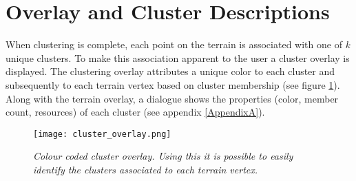 \section{Overlay and Cluster Descriptions}

When clustering is complete, each point on the terrain is associated with one of \textit{k} unique clusters. To make this association apparent to the user a cluster overlay is displayed. The clustering overlay attributes a unique color to each cluster and subsequently to each terrain vertex based on cluster membership (see figure \ref{fig:cluster_overlay}). Along with the terrain overlay, a dialogue shows the properties (color, member count, resources) of each cluster (see appendix \ref{AppendixA}).

\begin{figure}
\center
	\texttt{[image: cluster\_overlay.png]}
	\caption{ \textit{Colour coded cluster overlay. Using this it is possible to easily identify the clusters associated to each terrain vertex.}}	
	\label{fig:cluster_overlay}
\end{figure}
